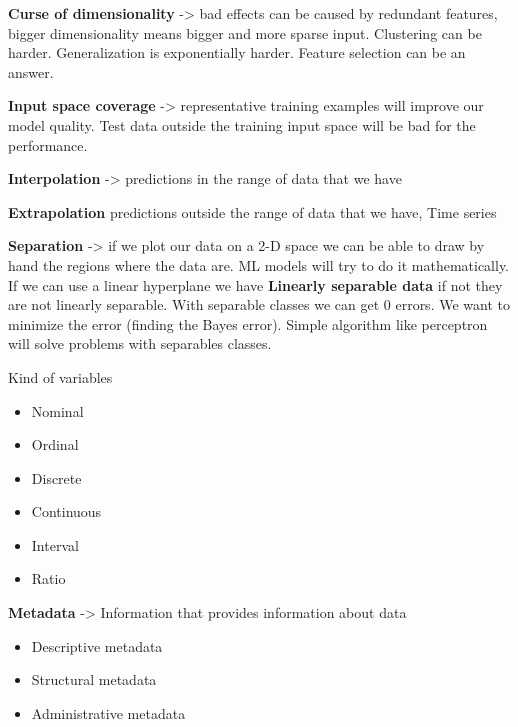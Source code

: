 \vspace{10pt}

\textbf{Curse of dimensionality} -> bad effects can be caused by redundant features, bigger dimensionality means bigger and more sparse input. Clustering can be harder. Generalization is exponentially harder. Feature selection can be an answer.

\vspace{10pt}

\textbf{Input space coverage} -> representative training examples will improve our model quality. Test data outside the training input space will be bad for the performance.

\vspace{10pt}

\textbf{Interpolation} -> predictions in the range of data that we have

\textbf{Extrapolation} predictions outside the range of data that we have, Time series

\textbf{Separation} -> if we plot our data on a 2-D space we can be able to draw by hand the regions where the data are. ML models will try to do it mathematically. If we can use a linear hyperplane we have \textbf{Linearly separable data} if not they are not linearly separable. With separable classes we can get 0 errors. We want to minimize the error (finding the Bayes error). Simple algorithm like perceptron will solve problems with separables classes.

\vspace{10pt}

Kind of variables
\begin{itemize}
    \item Nominal
    \item Ordinal
    \item Discrete
    \item Continuous
    \item Interval
    \item Ratio
\end{itemize}

\vspace{10pt}

\textbf{Metadata} -> Information that provides information about data

\begin{itemize}
    \item Descriptive metadata
    \item Structural metadata
    \item Administrative metadata
\end{itemize}

